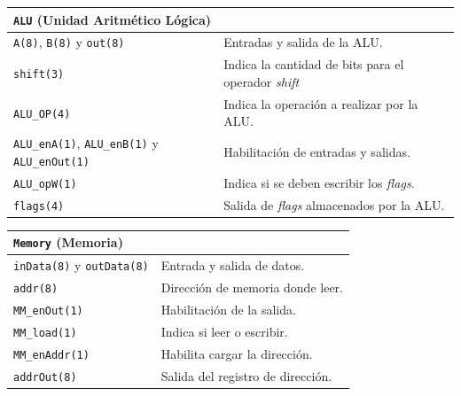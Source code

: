 \documentclass[a4paper,11pt]{article}
\begin{document}
\begin{center}
\begin{tabular}{p{6.4cm}|p{8.2cm}}
\multicolumn{2}{l}{ \texttt{ALU} (Unidad Aritmético Lógica) }\\ %
\hline
\texttt{A(8)}, \texttt{B(8)} y \texttt{out(8)}                      & Entradas y salida de la ALU.\\
\texttt{shift(3)}                                                   & Indica la cantidad de bits para el operador \emph{shift}\\
\texttt{ALU\_OP(4)}                                                 & Indica la operación a realizar por la ALU.\\
\texttt{ALU\_enA(1)}, \texttt{ALU\_enB(1)} y \texttt{ALU\_enOut(1)} & Habilitación de entradas y salidas. \\
\texttt{ALU\_opW(1)}                                                & Indica si se deben escribir los \emph{flags}.\\
\texttt{flags(4)}                                                   & Salida de \emph{flags} almacenados por la ALU.\\
\end{tabular}
\end{center}

\begin{center}
\begin{tabular}{p{6.4cm}|p{8.2cm}}
\multicolumn{2}{l}{ \texttt{Memory} (Memoria) }\\ %
\hline                                      
\texttt{inData(8)} y \texttt{outData(8)}    & Entrada y salida de datos.\\
\texttt{addr(8)}                            & Dirección de memoria donde leer.\\
\texttt{MM\_enOut(1)}                       & Habilitación de la salida.\\
\texttt{MM\_load(1)}                        & Indica si leer o escribir. \\
\texttt{MM\_enAddr(1)}                      & Habilita cargar la dirección. \\
\texttt{addrOut(8)}                         & Salida del registro de dirección. \\
\end{tabular}
\end{center}
\end{document}
